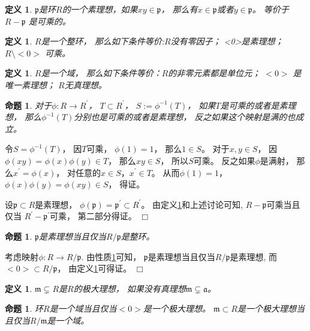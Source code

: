 \documentclass[12pt,a4paper]{ctexbook} %
\newcounter{theorem}[section]
\newtheorem{definition}[theorem]{定义}
\newtheorem{proposition}[theorem]{命题}
\numberwithin{figure}{section}
\theoremstyle{problemstyle}
\renewenvironment{proof}[1][证明]{\par\noindent{\kaishu\textbf{#1.} }\normalfont\fontspec{STFangsong}}{\hfill\ensuremath{\Box}\par}
\renewenvironment{proof}[1][证明]{\par\noindent{\kaishu\textbf{#1.} }\normalfont\CJKfamily{zhfs}}{\hfill\ensuremath{\Box}\par}
\numberwithin{equation}{section} %
\begin{document}
    \begin{definition}\label{prime-ideal}
    	$ \mathfrak{p} $是环$ R $的一个素理想，如果$ xy\in \mathfrak{p} $， 那么有$ x\in \mathfrak{p} $或者$ y\in \mathfrak{p} $。 等价于$ R- \mathfrak{p} $ 是可乘的。
    \end{definition}
    \begin{definition}\label{domin}
    	$ R $是一个整环， 那么如下条件等价:$ R $没有零因子； <0>是素理想；$ R \setminus <0> $ 可乘。
    \end{definition}
    \begin{definition}
    	$ R $是一个域， 那么如下条件等价：$ R $的非零元素都是单位元； $<0>$ 是唯一素理想； $ R $无真理想。
    \end{definition}
    \begin{proposition}\label{prop-prime-multi}
    	对于$ \phi:R\rightarrow R^{\prime} $， $ T\subset R^{\prime} $， $ S:=\phi^{-1}(T) $， 如果$ T $是可乘的或者是素理想， 那么$ \phi^{-1}(T) $分别也是可乘的或者是素理想， 反之如果这个映射是满的也成立。
    \end{proposition}
    \begin{proof}
    	令$ S=\phi^{-1}(T) $， 因$ T $可乘， $ \phi(1)=1 $， 那么$ 1\in S $。 对于$ x,y\in S $， 因$\phi(xy) =\phi(x)\phi(y)\in T $， 那么$ xy\in S $， 所以$ S $可乘。 反之如果$ \phi $是满射， 那么$ x^{\prime}=\phi(x) $， 对任意的$ x\in S， x^{\prime}\in T $。 从而$ \phi(1)=1 $， $ \phi(x)\phi(y)=\phi(xy)\in S $， 得证。
    	
    	设$ \mathfrak{p} \subset R$是素理想， $ \phi(\mathfrak{p})=\mathfrak{p} ^{\prime}\subset R^{\prime}$。 由定义\ref{prime-ideal}和上述讨论可知, $ R-\mathfrak{p} $可乘当且仅当 $ R^{\prime}-\mathfrak{p}^{\prime} $可乘， 第二部分得证。
    \end{proof}
     \begin{proposition}
     	$ \mathfrak{p} $是素理想当且仅当$ R/\mathfrak{p} $是整环。
     \end{proposition}
     \begin{proof}
     考虑映射$\phi:R\rightarrow R/ \mathfrak{p}  $. 由性质\ref{prop-prime-multi}可知， $ \mathfrak{p} $是素理想当且仅当$ R/ \mathfrak{p} $是素理想, 而$ <0>\subset R/ \mathfrak{p} $， 由定义\ref{domin}可得证。
     \end{proof}
     \begin{definition}
     	$ \mathfrak{m}\subsetneq R $是$ R $的极大理想， 如果没有真理想$ \mathfrak{m}\subsetneq\mathfrak{a} $。
     \end{definition}
     \begin{proposition}
     	环$ R $是一个域当且仅当$ <0> $是一个极大理想。 $ \mathfrak{m} \subset R$是一个极大理想当且仅当$  R/ \mathfrak{m}$是一个域。
     \end{proposition}
\end{document}
